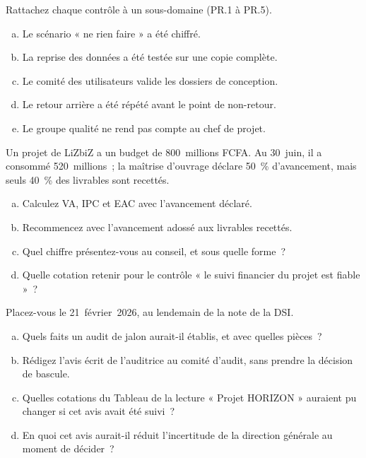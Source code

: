 \bigskip

\begin{boxexo}[title={\ding{45}\quad Exercice~19.1. Rattacher les contrôles \niveaubase}]
Rattachez chaque contrôle à un sous-domaine (PR.1 à PR.5).
\begin{enumerate}[(a)]
    \item Le scénario « ne rien faire » a été chiffré.
    \item La reprise des données a été testée sur une copie complète.
    \item Le comité des utilisateurs valide les dossiers de conception.
    \item Le retour arrière a été répété avant le point de non-retour.
    \item Le groupe qualité ne rend pas compte au chef de projet.
\end{enumerate}
\end{boxexo}

\begin{boxexo}[title={\ding{45}\quad Exercice~19.2. Calculer la valeur acquise \niveaumoyen}]
Un projet de LiZbiZ a un budget de 800~millions FCFA. Au 30~juin, il a
consommé 520~millions~; la maîtrise d'ouvrage déclare 50~\% d'avancement,
mais seuls 40~\% des livrables sont recettés.
\begin{enumerate}[(a)]
    \item Calculez VA, IPC et EAC avec l'avancement déclaré.
    \item Recommencez avec l'avancement adossé aux livrables recettés.
    \item Quel chiffre présentez-vous au conseil, et sous quelle forme~?
    \item Quelle cotation retenir pour le contrôle « le suivi financier du
          projet est fiable »~?
\end{enumerate}
\end{boxexo}

\begin{boxexo}[title={\ding{45}\quad Exercice~19.3. L'audit de jalon d'HORIZON \niveauexpert}]
Placez-vous le 21~février~2026, au lendemain de la note de la DSI.
\begin{enumerate}[(a)]
    \item Quels faits un audit de jalon aurait-il établis, et avec quelles
          pièces~?
    \item Rédigez l'avis écrit de l'auditrice au comité d'audit, sans
          prendre la décision de bascule.
    \item Quelles cotations du Tableau de la lecture « Projet HORIZON »
          auraient pu changer si cet avis avait été suivi~?
    \item En quoi cet avis aurait-il réduit l'incertitude de la direction
          générale au moment de décider~?
\end{enumerate}
\end{boxexo}

